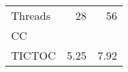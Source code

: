 \begin{tabular}{lrr}
\toprule
Threads &   28 &   56 \\
CC     &      &      \\
\midrule
TICTOC & 5.25 & 7.92 \\
\bottomrule
\end{tabular}
